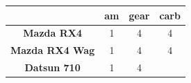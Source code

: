\documentclass[12pt,oneside]{reedthesis}
\theoremstyle{definition}
\theoremstyle{definition}
\theoremstyle{definition}
\theoremstyle{remark}
\begin{document}
\begin{longtable}[]{@{}cccc@{}}
\toprule
\begin{minipage}[b]{0.30\columnwidth}\centering\strut
~\strut
\end{minipage} & \begin{minipage}[b]{0.06\columnwidth}\centering\strut
am\strut
\end{minipage} & \begin{minipage}[b]{0.09\columnwidth}\centering\strut
gear\strut
\end{minipage} & \begin{minipage}[b]{0.09\columnwidth}\centering\strut
carb\strut
\end{minipage}\tabularnewline
\midrule
\endhead
\begin{minipage}[t]{0.30\columnwidth}\centering\strut
\textbf{Mazda RX4}\strut
\end{minipage} & \begin{minipage}[t]{0.06\columnwidth}\centering\strut
1\strut
\end{minipage} & \begin{minipage}[t]{0.09\columnwidth}\centering\strut
4\strut
\end{minipage} & \begin{minipage}[t]{0.09\columnwidth}\centering\strut
4\strut
\end{minipage}\tabularnewline
\begin{minipage}[t]{0.30\columnwidth}\centering\strut
\textbf{Mazda RX4 Wag}\strut
\end{minipage} & \begin{minipage}[t]{0.06\columnwidth}\centering\strut
1\strut
\end{minipage} & \begin{minipage}[t]{0.09\columnwidth}\centering\strut
4\strut
\end{minipage} & \begin{minipage}[t]{0.09\columnwidth}\centering\strut
4\strut
\end{minipage}\tabularnewline
\begin{minipage}[t]{0.30\columnwidth}\centering\strut
\textbf{Datsun 710}\strut
\end{minipage} & \begin{minipage}[t]{0.06\columnwidth}\centering\strut
1\strut
\end{minipage} & \begin{minipage}[t]{0.09\columnwidth}\centering\strut
4\strut
\end{minipage} & \begin{minipage}[t]{0.09\columnwidth}\centering\strut

\end{minipage}
\end{longtable}
\end{document}
